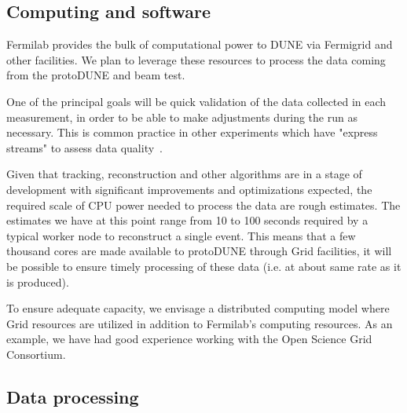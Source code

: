 \subsection{Computing and software}


Fermilab provides the bulk of computational power to DUNE via Fermigrid and other facilities. 
We plan to leverage these resources to process the data coming from the protoDUNE and beam test.

One of the principal goals will be quick validation of the data collected in each measurement, in
order to be able to make adjustments during the run as necessary. 
This is common practice in other experiments which have "express streams" to assess data quality~\cite{atlas_express}.


Given that tracking, reconstruction and other algorithms are in a stage of development with significant improvements
and optimizations expected, the required scale of CPU power needed to process the data are rough estimates.
The estimates we have at this point range from 10 to 100 seconds required by a typical worker node to reconstruct
a single event.  This means that a few thousand cores are made available to protoDUNE through Grid facilities, it will be
possible to ensure timely processing of these data (i.e. at about same rate as it is produced).

To ensure adequate capacity, we envisage a distributed computing model where Grid resources are
utilized in addition to Fermilab's computing resources. As an example, we have had good experience working
with the Open Science Grid Consortium.


\subsection{Data processing}
\label{sec:protodune-dataprocess}

